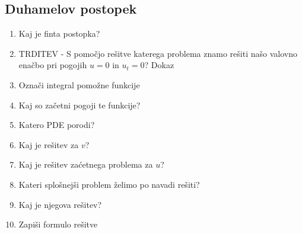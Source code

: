 \documentclass{article}
\begin{document}
    \subsection{Duhamelov postopek}
    \begin{enumerate}
        \item Kaj je finta postopka?
        \item TRDITEV - S pomočjo rešitve katerega problema znamo rešiti našo valovno enačbo pri pogojih $u = 0$ in $u_t = 0$?
        Dokaz
        \item Označi integral pomožne funkcije
        \item Kaj so začetni pogoji te funkcije?
        \item Katero PDE porodi?
        \item Kaj je rešitev za $v$?
        \item Kaj je rešitev zaćetnega problema za $u$?
        \item Kateri splošnejši problem želimo po navadi rešiti?
        \item Kaj je njegova rešitev?
        \item Zapiši formulo rešitve
    \end{enumerate}
\end{document}
